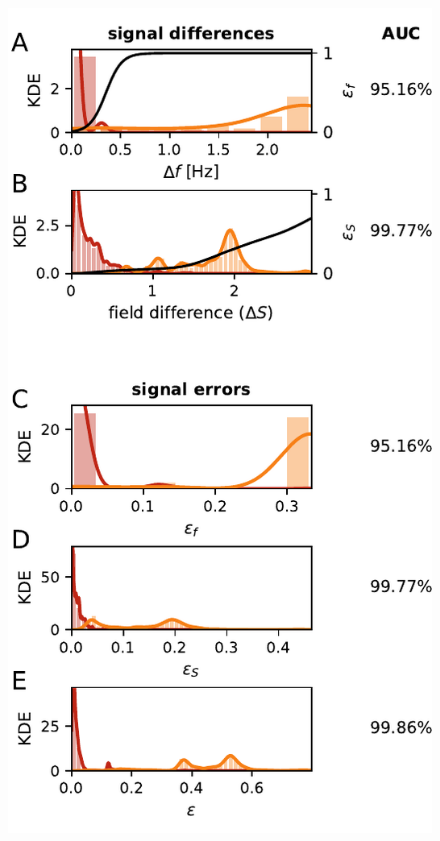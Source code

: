 \documentclass[11pt,pdftex]{article}
\begin{document}
\begin{figure}[t]
  \begin{minipage}[t]{0.4\textwidth}\mbox{}\\[-2ex]
    \includegraphics{signal_diff_error}
  \end{minipage}
  \hfill
  \begin{minipage}[t]{0.45\textwidth}

\end{minipage}
\end{figure}
\end{document}
